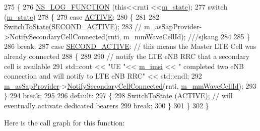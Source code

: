 \begin{DoxyCode}
275 \{
276   \hyperlink{log-macros-disabled_8h_a90b90d5bad1f39cb1b64923ea94c0761}{NS\_LOG\_FUNCTION} (\textcolor{keyword}{this}<<rnti <<\hyperlink{classns3_1_1EpcUeNas_a1717ecab2177c959111e14fdad7972d0}{m\_state});
277   \textcolor{keywordflow}{switch} (\hyperlink{classns3_1_1EpcUeNas_a1717ecab2177c959111e14fdad7972d0}{m\_state})
278   \{
279   \textcolor{keywordflow}{case} \hyperlink{classns3_1_1EpcUeNas_a8047255fecfac11c9e1abe6f13d527dcaf80ef9922299d94e3623f0746cb478cc}{ACTIVE}:
280   \{
281 
282    \hyperlink{classns3_1_1EpcUeNas_a00835b29963b7eff0c4a8f1bc82a91fe}{SwitchToState}(\hyperlink{classns3_1_1EpcUeNas_a8047255fecfac11c9e1abe6f13d527dca030e2ae6d3c62c94c68fadd74bf5bf95}{SECOND\_ACTIVE});
283   \textcolor{comment}{// m\_asSapProvider->NotifySecondaryCellConnected(rnti, m\_mmWaveCellId); ///sjkang}
284 
285           \}
286           \textcolor{keywordflow}{break};
287         \textcolor{keywordflow}{case} \hyperlink{classns3_1_1EpcUeNas_a8047255fecfac11c9e1abe6f13d527dca030e2ae6d3c62c94c68fadd74bf5bf95}{SECOND\_ACTIVE}: \textcolor{comment}{// this means the Master LTE Cell was already connected}
288       \{
289 
290           \textcolor{comment}{// notify the LTE eNB RRC that a secondary cell is available}
291           std::cout << \textcolor{stringliteral}{"UE "}<< \hyperlink{classns3_1_1EpcUeNas_a0d541bfcaf7775052a7889bbd706fe02}{m\_imsi} << \textcolor{stringliteral}{" completed two eNB connection and will notify to LTE eNB
       RRC"} << std::endl;
292         \hyperlink{classns3_1_1EpcUeNas_a989e75be6c48906d2b2deb55147a10fd}{m\_asSapProvider}->\hyperlink{classns3_1_1LteAsSapProvider_a23a81b1387bafa95da5c552e673ae17a}{NotifySecondaryCellConnected}(rnti, 
      \hyperlink{classns3_1_1EpcUeNas_ae574d1d6cae34ecde7a1083b36b6d19b}{m\_mmWaveCellId}); 
293       \}
294       \textcolor{keywordflow}{break};
295 
296    \textcolor{keywordflow}{default}:
297    \{
298             \hyperlink{classns3_1_1EpcUeNas_a00835b29963b7eff0c4a8f1bc82a91fe}{SwitchToState} (\hyperlink{classns3_1_1EpcUeNas_a8047255fecfac11c9e1abe6f13d527dcaf80ef9922299d94e3623f0746cb478cc}{ACTIVE}); \textcolor{comment}{// will eventually activate dedicated bearers}
299       \textcolor{keywordflow}{break};
300    \}
301   \}
302 \}
\end{DoxyCode}


Here is the call graph for this function\+:


